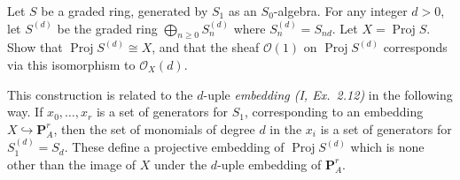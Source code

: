 \documentclass[10pt]{article}
\theoremstyle{definition}
\theoremstyle{remark}
\numberwithin{equation}{section}
\numberwithin{figure}{subsubsection}
\DeclareMathOperator{\Proj}{Proj}
\newcommand{\OO}{\mathcal{O}}
\begin{document}
\begin{problem}
  Let $S$ be a graded ring, generated by $S_1$ as an $S_0$-algebra. For any integer $d > 0$, let $S^{(d)}$ be the graded ring $\bigoplus_{n \ge 0} S_n^{(d)}$ where $S_n^{(d)} = S_{nd}$. Let $X = \Proj S$. Show that $\Proj S^{(d)} \cong X$, and that the sheaf $\OO(1)$ on $\Proj S^{(d)}$ corresponds via this isomorphism to $\OO_X(d)$.
  \par This construction is related to the $d$-uple \emph{embedding (I, Ex.~2.12)} in the following way. If $x_0,\ldots,x_r$ is a set of generators for $S_1$, corresponding to an embedding $X \hookrightarrow \mathbf{P}^r_A$, then the set of monomials of degree $d$ in the $x_i$ is a set of generators for $S_1^{(d)} = S_d$. These define a projective embedding of $\Proj S^{(d)}$ which is none other than the image of $X$ under the $d$-uple embedding of $\mathbf{P}^r_A$.
\end{problem}
\end{document}
